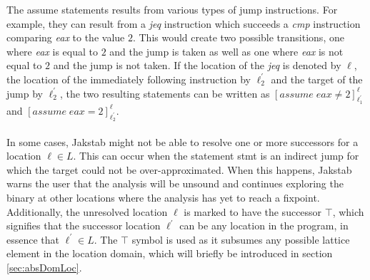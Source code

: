 \documentclass{kththesis}
\renewcommand{\it}[1]{\textit{#1}}
\begin{document}
The assume statements results from various types of jump instructions. For example, they can result from a \it{jeq} instruction which succeeds a \it{cmp} instruction comparing \it{eax} to the value $2$. This would create two possible transitions, one where \it{eax} is equal to $2$ and the jump is taken as well as one where \it{eax} is not equal to $2$ and the jump is not taken. If the location of the \it{jeq} is denoted by $\ell$, the location of the immediately following instruction by $\ell^{'}_{2}$ and the target of the jump by $\ell^{'}_{2}$, the two resulting statements can be written as $[assume\;eax \neq 2]^{\ell}_{\ell^{'}_{1}}$ and $[assume\;eax = 2]^{\ell}_{\ell^{'}_{2}}$.
\\ \\
In some cases, Jakstab might not be able to resolve one or more successors for a location $\ell \in L$. This can occur when the statement stmt is an indirect jump for which the target could not be over-approximated. When this happens, Jakstab warns the user that the analysis will be unsound and continues exploring the binary at other locations where the analysis has yet to reach a fixpoint. Additionally, the unresolved location $\ell$ is marked to have the successor $\top$, which signifies that the successor location $\ell^{'}$ can be any location in the program, in essence that $\ell^{'} \in L$. The $\top$ symbol is used as it subsumes any possible lattice element in the location domain, which will briefly be introduced in section \ref{sec:absDomLoc}. 



\end{document}
